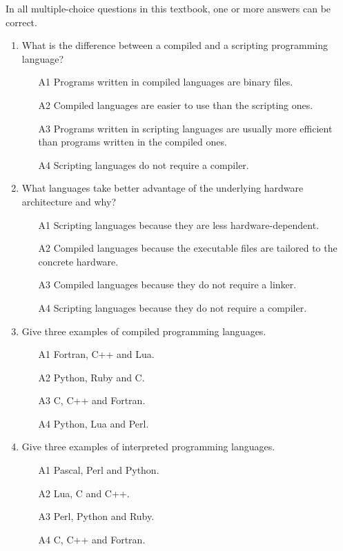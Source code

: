\documentclass[article,A4,12pt]{llncs}
\begin{document}
In all multiple-choice questions in this textbook, one or more answers can be correct. 
\begin{enumerate}
\item What is the difference between a compiled and a scripting programming language?
\begin{enumerate}
\item[A1] Programs written in compiled languages are binary files. 
\item[A2] Compiled languages are easier to use than the scripting ones.
\item[A3] Programs written in scripting languages are usually more efficient than programs 
          written in the compiled ones.
\item[A4] Scripting languages do not require a compiler.
\end{enumerate}
\item What languages take better advantage of the underlying hardware architecture
      and why?
\begin{enumerate}
\item[A1] Scripting languages because they are less hardware-dependent.
\item[A2] Compiled languages because the executable files are tailored 
          to the concrete hardware.
\item[A3] Compiled languages because  they do not require a linker.
\item[A4] Scripting languages because they do not require a compiler.
\end{enumerate}
\item Give three examples of compiled programming languages.
\begin{enumerate}
\item[A1] Fortran, C++ and Lua.
\item[A2] Python, Ruby and C.
\item[A3] C, C++ and Fortran.
\item[A4] Python, Lua and Perl.
\end{enumerate}
\item Give three examples of interpreted programming languages.
\begin{enumerate}
\item[A1] Pascal, Perl and Python.
\item[A2] Lua, C and C++.
\item[A3] Perl, Python and Ruby. 
\item[A4] C, C++ and Fortran.
\end{enumerate}

\end{enumerate}
\end{document}
